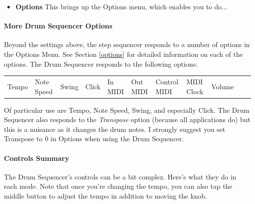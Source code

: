 \documentclass{article}
\begin{document}
\begin{itemize}

\item {\bf Options} \quad This brings up the Options menu, which enables you to do...
\end{itemize}


\setlength{\leftskip}{0em}

\paragraph{More Drum Sequencer Options}

Beyond the settings above, the step sequencer responds to a number of options in the Options Menu.  See Section \ref{options} for detailed information on each of the options.  The Drum Sequencer responds to the following options:


\begin{center}
\begin{tabular}{lllllllllll}
Tempo& Note Speed& Swing & Click&
In MIDI& Out MIDI&Control MIDI&MIDI Clock&Volume\\
\end{tabular}
\end{center}

Of particular use are Tempo, Note Speed, Swing, and especially Click.  The Drum Sequencer also responds to the {\it Transpose} option (because all applications do) but this is a nuisance as it changes the drum notes.  I strongly suggest you set Transpose to 0 in Options when using the Drum Sequencer.


\paragraph{Controls Summary}  The Drum Sequencer's controls can be a bit complex.  Here's what they do in each mode.  Note that once you're changing the tempo, you can also tap the middle button to adjust the tempo in addition to moving the knob.
\end{document}
